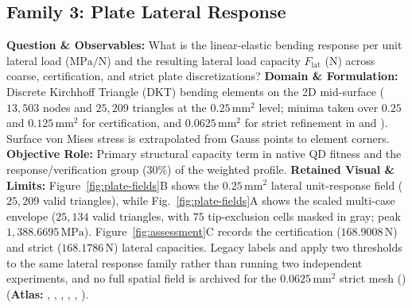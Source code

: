 \subsection{Family 3: Plate Lateral Response}
\label{subsec:family-lateral}
\textbf{Question \& Observables:} What is the linear-elastic bending response per unit lateral load ($\mathrm{MPa/N}$) and the resulting lateral load capacity $F_{\mathrm{lat}}$ ($\mathrm{N}$) across coarse, certification, and strict plate discretizations?
\textbf{Domain \& Formulation:} Discrete Kirchhoff Triangle (DKT) bending elements on the 2D mid-surface ($13{,}503$ nodes and $25{,}209$ triangles at the $0.25\,\mathrm{mm}^2$ level; minima taken over $0.25$ and $0.125\,\mathrm{mm}^2$ for certification, and $0.0625\,\mathrm{mm}^2$ for strict refinement in  and ). Surface von Mises stress is extrapolated from Gauss points to element corners.
\textbf{Objective Role:} Primary structural capacity term in native QD fitness and the response/verification group (30\%) of the weighted profile.
\textbf{Retained Visual \& Limits:} Figure~\ref{fig:plate-fields}B shows the $0.25\,\mathrm{mm}^2$ lateral unit-response field ($25{,}209$ valid triangles), while Fig.~\ref{fig:plate-fields}A shows the scaled multi-case envelope ($25{,}134$ valid triangles, with $75$ tip-exclusion cells masked in gray; peak $1{,}388.6695\,\mathrm{MPa}$). Figure~\ref{fig:assessment}C records the certification ($168.9008\,\mathrm{N}$) and strict ($168.1786\,\mathrm{N}$) lateral capacities. Legacy labels  and  apply two thresholds to the same lateral response family rather than running two independent experiments, and no full spatial field is archived for the $0.0625\,\mathrm{mm}^2$ strict mesh () (\textbf{Atlas:} , , , , , ).

